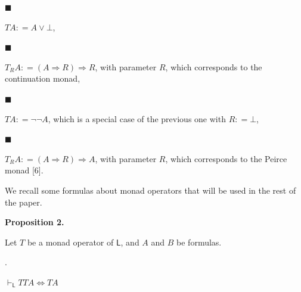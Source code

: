 \documentclass[10pt,a4paper]{article}
\begin{document}
\par\noindent  $\blacksquare$ 
 
$TA\mathrel{\mathop{:}}=A\mathbin{\vee}\bot$,\par
 
 
 
\par\noindent  $\blacksquare$ 
 
$T_{R}A\mathrel{\mathop{:}}=(A\mathbin{\Rightarrow}R)\mathbin{\Rightarrow}R$, with parameter $R$, which corresponds to the continuation monad,\par
 
 
 
\par\noindent  $\blacksquare$ 
 
$TA\mathrel{\mathop{:}}=\neg\neg A$, which is a special case of the previous one with $R\mathrel{\mathop{:}}=\bot$,\par
 
 
 
\par\noindent  $\blacksquare$ 
 
$T_{R}A\mathrel{\mathop{:}}=(A\mathbin{\Rightarrow}R)\mathbin{\Rightarrow}A$, with parameter $R$, which corresponds to the Peirce monad [6].\par
 
 
  
 
 
 
We recall some formulas about monad operators that will be used in the rest of the paper.\par
 
 
 
\par\medskip\noindent\textbf{Proposition 2.}\par
 
 
Let $T$ be a monad operator of $\mathsf{L}$, and $A$ and $B$ be formulas.\par
  
\par{}. 
 
$\vdash_{\mathsf{L}}TTA\Leftrightarrow TA$\par
 
\end{document}
